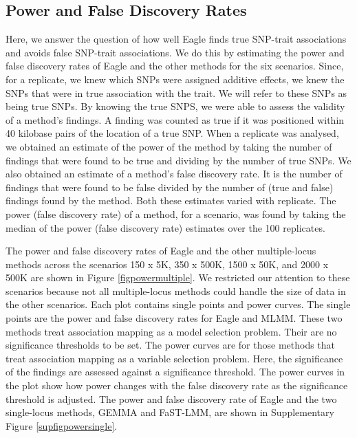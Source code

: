 \documentclass{article}
\begin{document}
 
 





\subsection{Power and False Discovery Rates}

Here, we answer the question of how well Eagle finds true SNP-trait associations and avoids false SNP-trait associations. We do this by estimating the power and false discovery rates of Eagle and the other methods for the six scenarios.  Since, for a replicate, we knew which SNPs were assigned additive effects, we knew the SNPs that were in true association with the trait. We will refer to these SNPs as being
true SNPs. By knowing the true SNPS, we were able to assess the validity of a method's findings. A  finding was counted as true if it was positioned within 40 kilobase pairs of the location of a true SNP. When a replicate was analysed, we obtained an estimate of the power of the method by taking  the number of findings that were found to be  true and dividing by the 
number of true SNPs. We also obtained an estimate of a method's false discovery rate. It is the number of findings that were found to be false divided by the number of (true and false) findings found by the method.  Both these estimates varied with replicate. 
The power (false discovery rate) of a method, for a scenario, was found by taking the median of the power (false discovery rate) estimates over the 100 replicates. 


The power and false discovery rates of Eagle and the other multiple-locus methods across the scenarios 150 x 5K, 350 x 500K, 1500 x 50K, and 2000 x 500K are shown in Figure \ref{figpowermultiple}.  We restricted our attention to these scenarios because not all 
multiple-locus methods could handle the size of data in the other scenarios. 
  Each plot contains 
single points and power curves. The single points are the power and false discovery rates for Eagle and MLMM.
These two methods treat association mapping as a model selection problem. Their are no significance thresholds to be set. 
The power curves are for those methods that treat association mapping as a variable selection problem. Here, the 
significance of the findings are assessed against a significance threshold. The power curves in the plot show how power changes with 
the false discovery rate as the significance threshold  is adjusted. 
The power and false discovery rate of Eagle and the two single-locus methods, GEMMA and FaST-LMM,  are shown in
Supplementary Figure \ref{supfigpowersingle}. 
\end{document}
